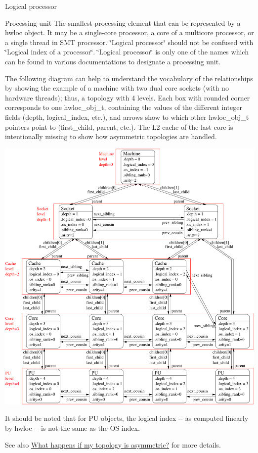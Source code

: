 \begin{DoxyDescription}
\item[Logical processor ]
\item[Processing unit ]The smallest processing element that can be represented by a hwloc object. It may be a single-\/core processor, a core of a multicore processor, or a single thread in SMT processor. \char`\"{}Logical processor\char`\"{} should not be confused with \char`\"{}Logical index of a
  processor\char`\"{}. \char`\"{}Logical processor\char`\"{} is only one of the names which can be found in various documentations to designate a processing unit. 


\end{DoxyDescription}

The following diagram can help to understand the vocabulary of the relationships by showing the example of a machine with two dual core sockets (with no hardware threads); thus, a topology with 4 levels. Each box with rounded corner corresponds to one hwloc\_\-obj\_\-t, containing the values of the different integer fields (depth, logical\_\-index, etc.), and arrows show to which other hwloc\_\-obj\_\-t pointers point to (first\_\-child, parent, etc.). The L2 cache of the last core is intentionally missing to show how asymmetric topologies are handled.

 
\begin{DoxyImageNoCaption}
  \mbox{\includegraphics[width=\textwidth]{diagram}}
\end{DoxyImageNoCaption}


It should be noted that for PU objects, the logical index -\/-\/ as computed linearly by hwloc -\/-\/ is not the same as the OS index.

See also \hyperlink{a00011_faq_asymmetric}{What happens if my topology is asymmetric?} for more details. 